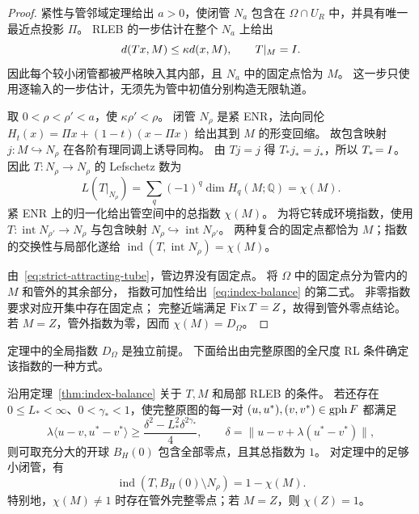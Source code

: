 \begin{proof}
紧性与管邻域定理给出 $a>0$，使闭管 $N_a$ 包含在
$\Omega\cap U_R$ 中，并具有唯一最近点投影 $\Pi$。
RLEB 的一步估计在整个 $N_a$ 上给出
\begin{equation}
\label{eq:strict-attracting-tube}
 d(Tx,M)\le\kappa d(x,M),\qquad T|_M=I.
\end{equation}
因此每个较小闭管都被严格映入其内部，且 $N_a$ 中的固定点恰为 $M$。
这一步只使用逐输入的一步估计，无须先为管中初值分别构造无限轨道。

取 $0<\rho<\rho'<a$，使 $\kappa\rho'<\rho$。
闭管 $N_\rho$ 是紧 ENR，法向同伦
$H_t(x)=\Pi x+(1-t)(x-\Pi x)$ 给出其到 $M$ 的形变回缩。
故包含映射 $j:M\hookrightarrow N_\rho$ 在各阶有理同调上诱导同构。
由 $Tj=j$ 得 $T_*j_*=j_*$，所以 $T_*\!=I$。
因此 $T:N_\rho\to N_\rho$ 的 Lefschetz 数为
\[
 L(T|_{N_\rho})
 =\sum_q(-1)^q\dim H_q(M;\mathbb Q)=\chi(M).
\]
紧 ENR 上的归一化给出管空间中的总指数 $\chi(M)$。
为将它转成环境指数，使用
$T:\operatorname{int}N_{\rho'}\to N_\rho$ 与包含映射
$N_\rho\hookrightarrow\operatorname{int}N_{\rho'}$。
两种复合的固定点都恰为 $M$；指数的交换性与局部化遂给
$\operatorname{ind}(T,\operatorname{int}N_\rho)=\chi(M)$。

由~\eqref{eq:strict-attracting-tube}，管边界没有固定点。
将 $\Omega$ 中的固定点分为管内的 $M$ 和管外的其余部分，
指数可加性给出~\eqref{eq:index-balance} 的第二式。
非零指数要求对应开集中存在固定点；
完整近端满足 $\operatorname{Fix} T=Z$，故得到管外零点结论。
若 $M=Z$，管外指数为零，因而 $\chi(M)=D_\Omega$。
\end{proof}

定理中的全局指数 $D_\Omega$ 是独立前提。
下面给出由完整原图的全尺度 RL 条件确定该指数的一种方式。

\begin{corollary}
\label{cor:global-RL-euler}
\label{prop:rleb-euler}
沿用定理~\ref{thm:index-balance} 关于 $T,M$ 和局部 RLEB 的条件。
若还存在 $0\le L_*<\infty$、$0<\gamma_*<1$，使完整原图的每一对
$(u,u^*),(v,v^*)\in\operatorname{gph} F$ 都满足
\begin{equation}
\label{eq:global-graph-RL-topology}
 \lambda\langle u-v,u^*-v^*\rangle
 \ge\frac{\delta^2-L_*^2\delta^{2\gamma_*}}4,
 \qquad \delta=\|u-v+\lambda(u^*-v^*)\|,
\end{equation}
则可取充分大的开球 $B_H(0)$ 包含全部零点，且其总指数为 $1$。
对定理中的足够小闭管，有
\[
 \operatorname{ind}(T,B_H(0)\setminus N_\rho)=1-\chi(M).
\]
特别地，$\chi(M)\ne1$ 时存在管外完整零点；若 $M=Z$，则 $\chi(Z)=1$。
\end{corollary}

